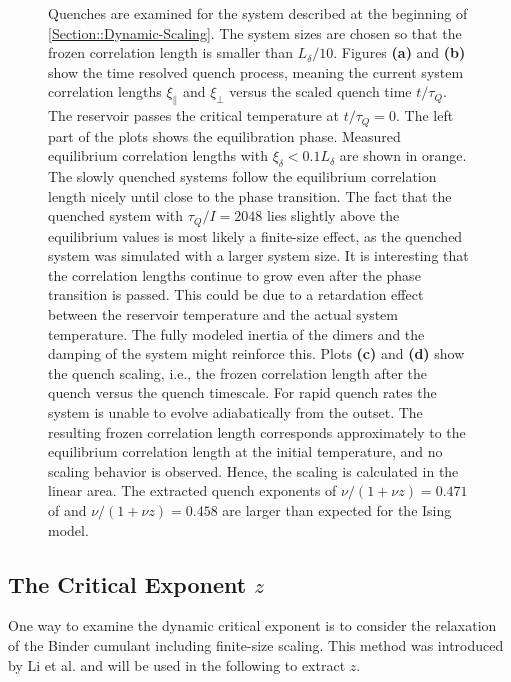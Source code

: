 \begin{figure}
		\caption{Quenches are examined for the system described at the beginning of \autoref{Section::Dynamic-Scaling}. The system sizes are chosen so that the frozen correlation length is smaller than $L_\delta/10$. Figures \textbf{(a)} and \textbf{(b)} show the time resolved quench process, meaning the current system correlation lengths $\xi_\parallel$ and $\xi_\perp$ versus the scaled quench time $t /	\tau_Q$. The reservoir passes the critical temperature at $t /	\tau_Q =	0$. The left part of the plots shows the equilibration phase. Measured equilibrium correlation lengths with $\xi_\delta < 0.1 L_\delta$ are shown in orange. The slowly quenched systems follow the equilibrium correlation length nicely until close to the phase transition. The fact that the quenched system with $\tau_Q /	I =	2048$ lies slightly above the equilibrium values is most likely a finite-size effect, as the quenched system was simulated with a larger system size. It is interesting that the correlation lengths continue to grow even after the phase transition is passed. This could be due to a retardation effect between the reservoir temperature and the actual system temperature. The fully modeled inertia of the dimers and the damping of the system might reinforce this. Plots \textbf{(c)} and \textbf{(d)} show the quench scaling, i.e., the frozen correlation length after the quench versus the quench timescale. For rapid quench rates the system is unable to evolve adiabatically from the outset. The resulting frozen correlation length corresponds approximately to the equilibrium correlation length at the initial temperature, and no scaling behavior is observed. Hence, the scaling is calculated in the linear area. The extracted quench exponents of $\nu / (1 + \nu z) = 0.471$ of and $\nu / (1 + \nu z) = 0.458$ are larger than expected for the Ising model. }
		\label{Fig::Quench-Result}
	\end{figure}
	\subsection{The Critical Exponent ${z}$}
	One way to examine the dynamic critical exponent is to consider the relaxation of the Binder cumulant including finite-size scaling. This method was introduced by Li et al. \cite{li1995dynamic} and will be used in the following to extract $z$. \\
	

